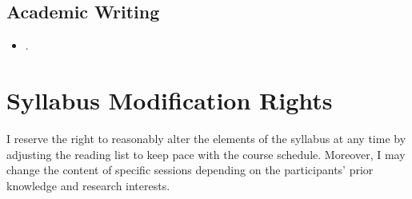 \documentclass[abstract=on,parskip=full,headings=standardclasses,fontsize=11pt,paper=a4]{scrartcl}
\begin{document}
\subsection*{Academic Writing}
\begin{itemize}
\item {}.
\end{itemize}


\section*{Syllabus Modification Rights}

I reserve the right to reasonably alter the elements of the syllabus at any time by adjusting the reading list to keep pace with the course schedule. Moreover, I may change the content of specific sessions depending on the participants' prior knowledge and research interests.


\end{document}
